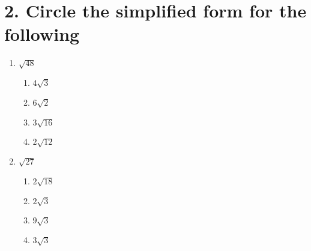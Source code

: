 \documentclass{hw}
\begin{document}
\section*{\normalsize 2. Circle the simplified form for the following}
\begin{enumerate}[label=\alph*.]
    \item $\sqrt{48}$
        \begin{enumerate}[label=\Alph*.]
        \item $4\sqrt{3}$
        \item $6\sqrt{2}$
        \item $3\sqrt{16}$
        \item $2\sqrt{12}$
        \end{enumerate}
        \studentworkspace
    \item $\sqrt{27}$
        \begin{enumerate}[label=\Alph*.]
        \item $2\sqrt{18}$
        \item $2\sqrt{3}$
        \item $9\sqrt{3}$
        \item $3\sqrt{3}$
        \end{enumerate}
        \studentworkspace
\end{enumerate}
\end{document}
